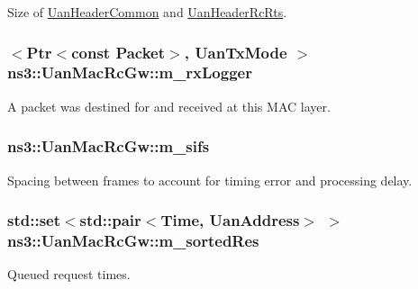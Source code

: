 Size of \hyperlink{classns3_1_1UanHeaderCommon}{Uan\+Header\+Common} and \hyperlink{classns3_1_1UanHeaderRcRts}{Uan\+Header\+Rc\+Rts}. 

\subsubsection[{\texorpdfstring{m\+\_\+rx\+Logger}{m_rxLogger}}]{$<${\bf Ptr}$<$const {\bf Packet}$>$, {\bf Uan\+Tx\+Mode} $>$ ns3\+::\+Uan\+Mac\+Rc\+Gw\+::m\+\_\+rx\+Logger\hspace{0.3cm}{\ttfamily [private]}}\hypertarget{classns3_1_1UanMacRcGw_af9c5b278e86a12e4aea40599b721f18e}{}\label{classns3_1_1UanMacRcGw_af9c5b278e86a12e4aea40599b721f18e}
A packet was destined for and received at this M\+AC layer. 
\subsubsection[{\texorpdfstring{m\+\_\+sifs}{m_sifs}}]{ ns3\+::\+Uan\+Mac\+Rc\+Gw\+::m\+\_\+sifs\hspace{0.3cm}{\ttfamily [private]}}\hypertarget{classns3_1_1UanMacRcGw_a563f1bf04fd1d1cf01c6590329e58b4c}{}\label{classns3_1_1UanMacRcGw_a563f1bf04fd1d1cf01c6590329e58b4c}


Spacing between frames to account for timing error and processing delay. 

\subsubsection[{\texorpdfstring{m\+\_\+sorted\+Res}{m_sortedRes}}]{\setlength{\rightskip}{0pt plus 5cm}std\+::set$<$std\+::pair$<${\bf Time}, {\bf Uan\+Address}$>$ $>$ ns3\+::\+Uan\+Mac\+Rc\+Gw\+::m\+\_\+sorted\+Res\hspace{0.3cm}{\ttfamily [private]}}\hypertarget{classns3_1_1UanMacRcGw_afe8430ebad788663b695fe54593f5fcf}{}\label{classns3_1_1UanMacRcGw_afe8430ebad788663b695fe54593f5fcf}
Queued request times. 
